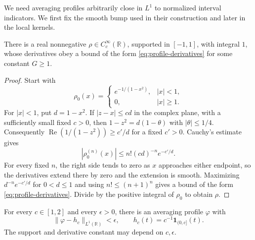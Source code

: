 We need averaging profiles arbitrarily close in \(L^1\) to normalized
interval indicators.  We first fix the smooth bump used in their
construction and later in the local kernels.

\begin{lemma}
\label{lem:ergodic-bump}
There is a real nonnegative \(\rho\in C_c^\infty(\mathbb R)\), supported
in \([-1,1]\), with integral \(1\), whose derivatives obey a bound of
the form \eqref{eq:profile-derivatives} for some constant \(G\geq1\).
\end{lemma}

\begin{proof}
Start with
\[
 \rho_0(x)=
 \begin{cases}e^{-1/(1-x^2)},&|x|<1,\\0,&|x|\geq1.\end{cases}
\]
For \(|x|<1\), put \(d=1-x^2\).  If \(|z-x|\leq c d\) in the complex
plane, with a sufficiently small fixed \(c>0\), then
\(1-z^2=d(1-\theta)\) with \(|\theta|\leq1/4\).  Consequently
\(\operatorname{Re}(1/(1-z^2))\geq c'/d\) for a fixed \(c'>0\).
Cauchy's estimate gives
\[
 |\rho_0^{(n)}(x)|\leq n!(cd)^{-n}e^{-c'/d}.
\]
For every fixed \(n\), the right side tends to zero as \(x\) approaches
either endpoint, so the derivatives extend there by zero and the
extension is smooth.  Maximizing \(d^{-n}e^{-c'/d}\) for \(0<d\leq1\)
and using \(n!\leq(n+1)^n\) gives a bound of the form
\eqref{eq:profile-derivatives}.  Divide by the positive integral of
\(\rho_0\) to obtain \(\rho\).
\end{proof}

\begin{lemma}
\label{lem:ergodic-moments}
For every \(c\in[1,2]\) and every \(\epsilon>0\), there is an averaging
profile \(\varphi\) with
\[
 \|\varphi-h_c\|_{L^1(\mathbb R)}<\epsilon,\qquad
 h_c(t)=c^{-1}\mathbf 1_{(0,c]}(t).
\]
The support and derivative constant may depend on \(c,\epsilon\).
\end{lemma}


